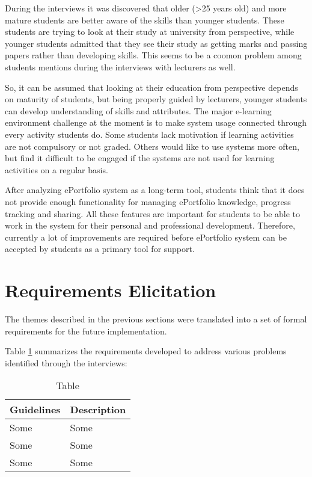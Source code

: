 During the interviews it was discovered that older (\textgreater 25 years old)
and more mature students are better aware of the \LLLs skills than younger
students. These students are trying to look at their study at university from
\LLLs perspective, while younger students admitted that they see their study as
getting marks and passing papers rather than developing skills. This seems to be
a coomon problem among students mentions during the interviews with lecturers as
well.

So, it can be assumed that looking at their education from \LLLs perspective
depends on maturity of students, but being properly guided by lecturers, younger
students can develop understanding of \LLLs skills and attributes. The major
e-learning environment challenge at the moment is to make system usage connected
through every activity students do. Some students lack motivation if learning
activities are not compulsory or not graded. Others would like to use systems
more often, but find it difficult to be engaged if the systems are not used for
learning activities on a regular basis. 

After analyzing ePortfolio system as a long-term tool, students think that it
does not provide enough functionality for managing ePortfolio knowledge,
progress tracking and sharing. All these features are important for students to
be able to work in the system for their personal and professional development.
Therefore, currently a lot of improvements are required before ePortfolio system
can be accepted by students as a primary tool for \LLLs support.

\section{Requirements Elicitation}

The themes described in the previous sections were translated into a set of
formal requirements for the future implementation.

Table \ref{tab:req} summarizes the requirements developed to address various problems
identified through the interviews:

\begin{table}[htb]
  \begin{center}
    \begin{tabular}{| l | p{6.5cm} |}
    \hline
     \multicolumn{1}{|c|}{\textbf{Guidelines}} &
     \multicolumn{1}{c|}{\textbf{Description}} \\
     \hline
     Some & Some \\ \hline
     Some & Some \\ \hline
     Some & Some \\ \hline
    \end{tabular}
  \end{center}
  \caption{Table}
  \label{tab:req}
\end{table}

